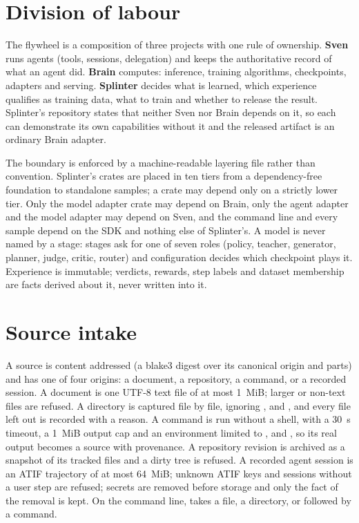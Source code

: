 
\section{Division of labour}\label{sec:architecture}\label{app:system}

The flywheel is a composition of three projects with one rule of ownership.
\textbf{Sven} runs agents (tools, sessions, delegation) and keeps the authoritative
record of what an agent did. \textbf{Brain} computes: inference, training algorithms,
checkpoints, adapters and serving. \textbf{Splinter} decides what is learned, which
experience qualifies as training data, what to train and whether to release the
result. Splinter's repository states that neither Sven nor Brain depends on
it, so each can demonstrate its own capabilities without it and the released artifact
is an ordinary Brain adapter.

The boundary is enforced by a machine-readable layering file rather than convention.
Splinter's crates are placed in ten tiers from a dependency-free foundation to
standalone samples; a crate may depend only on a strictly lower tier. Only the
model adapter crate may depend on Brain, only the agent adapter and the model adapter
may depend on Sven, and the command line and every sample depend on the SDK and
nothing else of Splinter's. A model is never named by a stage: stages
ask for one of seven roles (policy, teacher, generator, planner, judge, critic,
router) and configuration decides which checkpoint plays it. Experience is
immutable; verdicts, rewards, step labels and dataset membership are facts derived
about it, never written into it.

\section{Source intake}\label{sec:intake}

A source is content addressed (a blake3 digest over its canonical origin and parts) and
has one of four origins: a document, a repository, a command, or a recorded
session. A document is one UTF-8 text file of at most 1~MiB; larger or
non-text files are refused. A directory is captured file by file, ignoring
,  and , and every file left out is recorded
with a reason. A command is run without a shell, with a 30~s timeout, a 1~MiB
output cap and an environment limited to ,  and , so
its real output becomes a source with provenance. A repository revision is
archived as a snapshot of its tracked files and a dirty tree is refused. A
recorded agent session is an ATIF trajectory of at most 64~MiB; unknown ATIF keys and
sessions without a user step are refused; secrets are removed before storage and only
the fact of the removal is kept. On the command line,  takes a
file, a directory, or  followed by a command.

